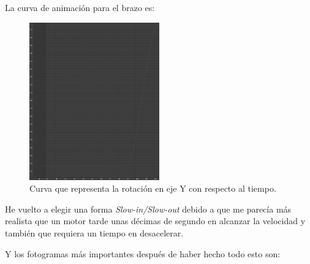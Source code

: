 \bigskip

La curva de animación para el brazo es:

\begin{figure}[H]
    \centering
    \includegraphics[width=0.5\textwidth]{imagenes/grua/rotY.png}
    \caption{Curva que representa la rotación en eje Y con respecto al tiempo.}
 \end{figure}

He vuelto a elegir una forma \textit{Slow-in/Slow-out} debido a que me parecía más realista que un motor tarde unas décimas de segundo en alcanzar la velocidad y también que requiera un tiempo en desacelerar.

\bigskip

Y los fotogramas más importantes después de haber hecho todo esto son:

